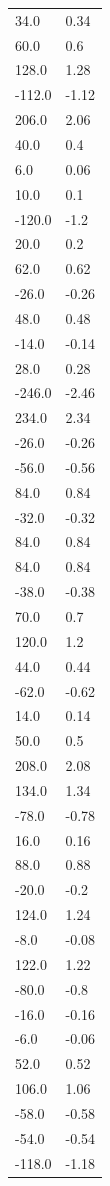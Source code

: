 \begin{longtable}{ll}
34.0 & 0.34 \\
60.0 & 0.6 \\
128.0 & 1.28 \\
-112.0 & -1.12 \\
206.0 & 2.06 \\
40.0 & 0.4 \\
6.0 & 0.06 \\
10.0 & 0.1 \\
-120.0 & -1.2 \\
20.0 & 0.2 \\
62.0 & 0.62 \\
-26.0 & -0.26 \\
48.0 & 0.48 \\
-14.0 & -0.14 \\
28.0 & 0.28 \\
-246.0 & -2.46 \\
234.0 & 2.34 \\
-26.0 & -0.26 \\
-56.0 & -0.56 \\
84.0 & 0.84 \\
-32.0 & -0.32 \\
84.0 & 0.84 \\
84.0 & 0.84 \\
-38.0 & -0.38 \\
70.0 & 0.7 \\
120.0 & 1.2 \\
44.0 & 0.44 \\
-62.0 & -0.62 \\
14.0 & 0.14 \\
50.0 & 0.5 \\
208.0 & 2.08 \\
134.0 & 1.34 \\
-78.0 & -0.78 \\
16.0 & 0.16 \\
88.0 & 0.88 \\
-20.0 & -0.2 \\
124.0 & 1.24 \\
-8.0 & -0.08 \\
122.0 & 1.22 \\
-80.0 & -0.8 \\
-16.0 & -0.16 \\
-6.0 & -0.06 \\
52.0 & 0.52 \\
106.0 & 1.06 \\
-58.0 & -0.58 \\
-54.0 & -0.54 \\
-118.0 & -1.18 \\

\end{longtable}
